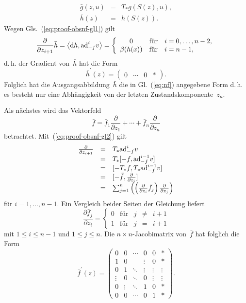 \begin{svmultproof2}
\begin{equation}
\begin{array}{lcl}
\bar{g}(z,u) & = & T_{*}g(S(z),u),\\
\bar{h}(z) & = & h(S(z)).
\end{array}\label{eq:proof-obsnf-bar-groessen}
\end{equation}
Wegen Gls.~(\ref{eq:proof-obsnf-gl1}) gilt
\begin{equation}
\frac{\partial}{\partial z_{i+1}}\bar{h}=\left\langle {\mathrm{d}} h,{\operatorname{ad}}_{-f}^{i}v\right\rangle =\left\{ \begin{array}{ccl}
0 & \mbox{für} & i=0,\ldots,n-2,\\
\beta(h(x)) & \mbox{für} & i=n-1,
\end{array}\right.\label{eq:proof-obsnf-dh-beta}
\end{equation}
d.\,h. der Gradient von~$\bar{h}$ hat die Form 
\[
\bar{h}^{\prime}(z)=\left(\begin{array}{cccc}
0 & \cdots & 0 & *\end{array}\right).
\]
Folglich hat die Ausgangsabbildung~$\bar{h}$ die in Gl.~(\ref{eq:nf})
angegebene Form d.\,h. es besteht nur eine Abhängigkeit von der letzten
Zustandskomponente~$z_{n}$.

Als nächstes wird das Vektorfeld 
\[
\bar{f}=\bar{f}_{1}\frac{\partial}{\partial z_{1}}+\cdots+\bar{f}_{n}\frac{\partial}{\partial z_{n}}
\]
betrachtet. Mit~(\ref{eq:proof-obsnf-gl2}) gilt 
\[
\begin{array}{ccl}
\tfrac{\partial}{\partial z_{i+1}} & = & T_{*}{\operatorname{ad}}_{-f}^{i}v\\
 & = & T_{*}[-f,{\operatorname{ad}}_{-f}^{i-1}v]\\
 & = & [-T_{*}f,T_{*}{\operatorname{ad}}_{-f}^{i-1}v]\\
 & = & [-\bar{f},\tfrac{\partial}{\partial z_{i}}]\\
 & = & \sum_{j=1}^{n}\left(\left(\tfrac{\partial}{\partial z_{i}}\bar{f}_{j}\right)\tfrac{\partial}{\partial z_{j}}\right)
\end{array}
\]
für $i=1,\ldots,n-1$. Ein Vergleich beider Seiten der Gleichung liefert
\[
\frac{\partial\bar{f}_{j}}{\partial z_{i}}=\left\{ \begin{array}{ccccc}
0 & \mbox{für} & j & \neq & i+1\\
1 & \mbox{für} & j & = & i+1
\end{array}\right.
\]
mit $1\leq i\leq n-1$ und $1\leq j\leq n$. Die $n\times n$-Jacobimatrix
von~$\bar{f}$ hat folglich die Form 
\begin{equation}
\bar{f}^{\prime}(z)=\left(\begin{array}{ccccc|c}
0 & 0 & \cdots & 0 & 0 & *\\
1 & 0 &  & \vdots & 0 & *\\
0 & 1 & \ddots & \vdots & \vdots & \vdots\\
\vdots & 0 & \ddots & 0 & \vdots & \vdots\\
0 & \vdots & \ddots & 1 & 0 & *\\
0 & 0 & \cdots & 0 & 1 & *
\end{array}\right).\label{eq:proof-obsnf-Form-DF}
\end{equation}


\end{svmultproof2}
